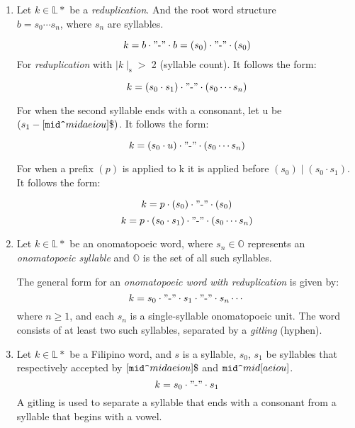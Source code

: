 \begin{enumerate}
      \item
            Let \(k \in \mathbb{L}*\) be a \textit{reduplication}. And the root word structure
            \\ \(b = s_0\cdots s_n\), where \(s_n\) are syllables.

            \[
                  k = b \cdot "\text{-}" \cdot b = (s_0) \cdot "\text{-}" \cdot (s_0)
            \]
            For \textit{reduplication} with $\mid k\mid_{\text{s}}>$ 2 (syllable count). It follows the form:

            \[
                  k = (s_0 \cdot s_1) \cdot "\text{-}" \cdot (s_0 \cdots s_n)
            \]

            For when the second syllable ends with a consonant, let u be\\
            \((s_1-[\verb\mid^\midaeiou]\$)\). It follows the form:

            \[
                  k = (s_0 \cdot u) \cdot "\text{-}" \cdot (s_0 \cdots s_n)
            \]

            For when a prefix \((p)\) is applied to k it is applied before \((s_0) \mid (s_0 \cdot s_1)\). It follows the form:

            \[
                  k = p \cdot (s_0) \cdot "\text{-}" \cdot (s_0)
            \]
            \[
                  k = p \cdot (s_0 \cdot s_1) \cdot "\text{-}" \cdot (s_0 \cdots s_n)
            \]
      \item
            Let \( k \in \mathbb{L}* \) be an onomatopoeic word, where \( s_n \in \mathbb{O} \) represents an \textit{onomatopoeic syllable} and \( \mathbb{O} \) is the set of all such syllables.

            The general form for an \textit{onomatopoeic word with reduplication} is given by:
            \[
                  k = s_0 \cdot "\text{-}" \cdot s_1 \cdot "\text{-}" \cdot s_n \cdots
            \]
            where \( n \geq 1 \), and each \( s_n \) is a single-syllable onomatopoeic unit. The word consists of at least two such syllables, separated by a \textit{gitling} (hyphen).

      \item
            Let \(k \in \mathbb{L}*\) be a Filipino word, and $s$ is a syllable, $s_0$, $s_1$ be syllables that respectively accepted by \([\verb\mid^\midaeiou]\$\) and \(\verb\mid^\mid[aeiou]\).
            \[
            k = s_0 \cdot "\text{-}" \cdot s_1
            \]
            A gitling is used to separate a syllable that ends with a consonant from a syllable that begins with a vowel.\\


\end{enumerate}
